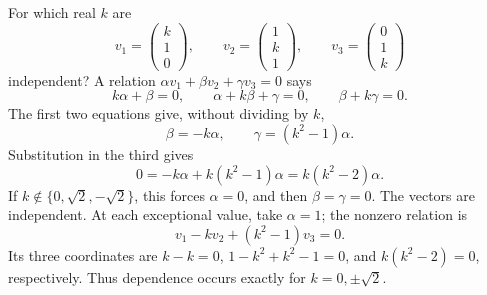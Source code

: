 \begin{example}\label{example:01:parameter}
For which real \(k\) are
\[
v_1=\begin{pmatrix}k\\1\\0\end{pmatrix},\qquad
v_2=\begin{pmatrix}1\\k\\1\end{pmatrix},\qquad
v_3=\begin{pmatrix}0\\1\\k\end{pmatrix}
\]
independent? A relation \(\alpha v_1+\beta v_2+\gamma v_3=0\) says
\[
k\alpha+\beta=0,\qquad \alpha+k\beta+\gamma=0,\qquad
\beta+k\gamma=0.
\]
The first two equations give, without dividing by \(k\),
\[
\beta=-k\alpha,\qquad \gamma=(k^2-1)\alpha.
\]
Substitution in the third gives
\[
0=-k\alpha+k(k^2-1)\alpha=k(k^2-2)\alpha.
\]
If \(k\notin\{0,\sqrt2,-\sqrt2\}\), this forces \(\alpha=0\), and then
\(\beta=\gamma=0\). The vectors are independent.
At each exceptional value, take \(\alpha=1\); the nonzero relation is
\[
v_1-kv_2+(k^2-1)v_3=0.
\]
Its three coordinates are \(k-k=0\),
\(1-k^2+k^2-1=0\), and \(k(k^2-2)=0\), respectively.
Thus dependence occurs exactly for \(k=0,\pm\sqrt2\).
\end{example}
